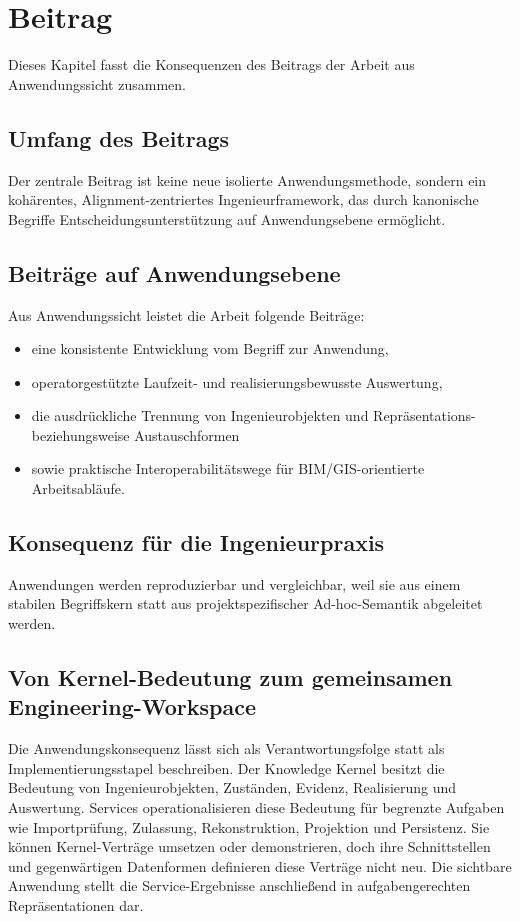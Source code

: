 \chapter{Beitrag}
\label{chap:applications-contribution}

Dieses Kapitel fasst die Konsequenzen des Beitrags der Arbeit aus
Anwendungssicht zusammen.

\section{Umfang des Beitrags}

Der zentrale Beitrag ist keine neue isolierte Anwendungsmethode, sondern
ein kohärentes, Alignment-zentriertes Ingenieurframework, das durch
kanonische Begriffe Entscheidungsunterstützung auf Anwendungsebene
ermöglicht.

\section{Beiträge auf Anwendungsebene}

Aus Anwendungssicht leistet die Arbeit folgende Beiträge:
\begin{itemize}
\item eine konsistente Entwicklung vom Begriff zur Anwendung,
\item operatorgestützte Laufzeit- und realisierungsbewusste Auswertung,
\item die ausdrückliche Trennung von Ingenieurobjekten und
Repräsentations- beziehungsweise Austauschformen
\item sowie praktische Interoperabilitätswege für BIM/GIS-orientierte
Arbeitsabläufe.
\end{itemize}

\section{Konsequenz für die Ingenieurpraxis}

Anwendungen werden reproduzierbar und vergleichbar, weil sie aus einem
stabilen Begriffskern statt aus projektspezifischer Ad-hoc-Semantik
abgeleitet werden.

\section{Von Kernel-Bedeutung zum gemeinsamen Engineering-Workspace}

Die Anwendungskonsequenz lässt sich als Verantwortungsfolge statt als
Implementierungsstapel beschreiben. Der Knowledge Kernel besitzt die Bedeutung
von Ingenieurobjekten, Zuständen, Evidenz, Realisierung und Auswertung. Services
operationalisieren diese Bedeutung für begrenzte Aufgaben wie Importprüfung,
Zulassung, Rekonstruktion, Projektion und Persistenz. Sie können Kernel-Verträge
umsetzen oder demonstrieren, doch ihre Schnittstellen und gegenwärtigen
Datenformen definieren diese Verträge nicht neu. Die sichtbare Anwendung stellt
die Service-Ergebnisse anschließend in aufgabengerechten Repräsentationen dar.


